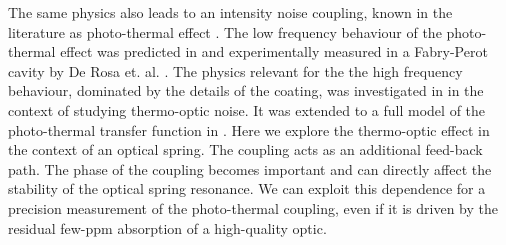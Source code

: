 The same physics also leads to an intensity noise coupling, known in the literature as photo-thermal effect \cite{Braginsky19991}. The low frequency behaviour of the photo-thermal effect was predicted in \cite{PhysRevD.63.082003} and experimentally measured in a Fabry-Perot cavity by De Rosa et. al. \cite{PhysRevLett.89.237402}. The physics relevant for the the high frequency behaviour, dominated by the details of the coating, was investigated in \cite{PhysRevD.78.102003} in the context of studying thermo-optic noise. It was extended to a full model of the photo-thermal transfer function in \cite{PhysRevD.91.023010}.
Here we explore the thermo-optic effect in the context of an optical spring. The coupling acts as an additional feed-back path. The phase of the coupling becomes important and can directly affect the stability of the optical spring resonance. We can exploit this dependence for a precision measurement of the photo-thermal coupling, even if it is driven by the residual few-ppm absorption of a high-quality optic.


